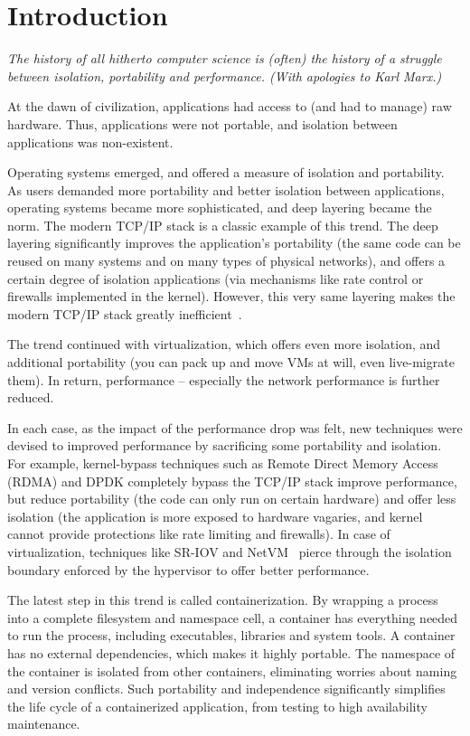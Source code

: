 \section{Introduction} 
\label{sec:introduction}

{\em 
The history of all hitherto computer science is (often) the history of a
struggle between isolation, portability and performance. (With apologies to Karl
Marx.)}

At the dawn of civilization, applications had access to (and had to manage) raw
hardware. Thus, applications were not portable, and isolation between
applications was non-existent.

Operating systems emerged, and offered a measure of isolation and portability.
As users demanded more portability and better isolation between applications,
operating systems became more sophisticated, and deep layering became the norm.
The modern TCP/IP stack is a classic example of this trend. The deep layering
significantly improves the application's portability (the same code can be reused
on many systems and on many types of physical networks), and offers a certain
degree of isolation applications (via mechanisms like rate control or firewalls
implemented in the kernel). 
However, this very same layering makes the modern TCP/IP stack greatly
inefficient~\cite{dcqcn,luigipapers}.   

The trend continued with virtualization, which offers even more isolation, and
additional portability (you can pack up and move VMs at will, even live-migrate
them). In return, performance -- especially the network performance is further
reduced.

In each case, as the impact of the performance drop was felt, new techniques
were devised to improved performance by sacrificing some portability and
isolation.  For example, kernel-bypass techniques such as Remote Direct Memory Access (RDMA) and
DPDK \cite{dpdk} completely bypass the TCP/IP stack improve performance, but reduce
portability (the code can only run on certain hardware) and offer less isolation
(the application is more exposed to hardware vagaries, and kernel cannot provide
protections like rate limiting and firewalls). In case of virtualization,
techniques like SR-IOV \cite{sriov} and NetVM~\cite{netvm} pierce through the
isolation boundary enforced by the hypervisor to offer better performance. 

The latest step in this trend is called containerization.  By wrapping a process
into a complete filesystem and namespace cell, a container has everything needed
to run the process, including executables, libraries and system tools.  A
container has no external dependencies, which makes it highly portable. The
namespace of the container is isolated from other containers, eliminating
worries about naming and version conflicts.  Such portability and independence
significantly simplifies the life cycle of a containerized application, from
testing to high availability maintenance.  

